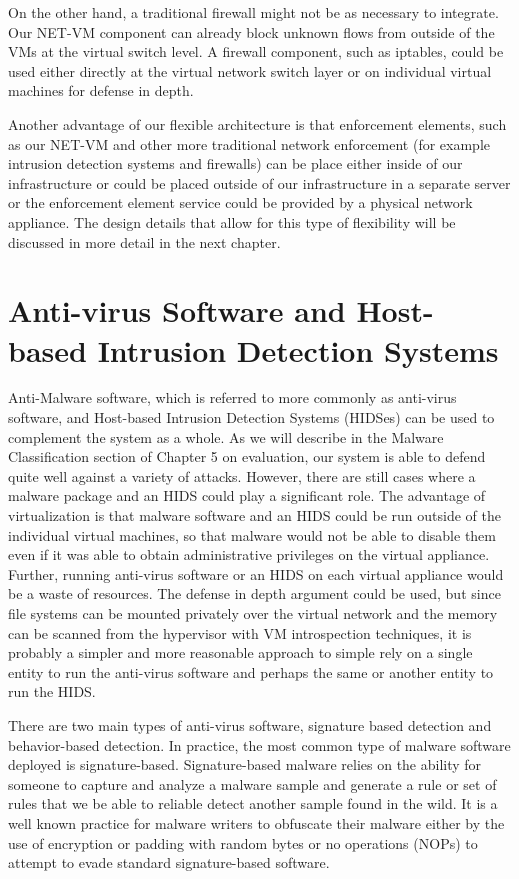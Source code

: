 On the other hand, a traditional firewall might not be as necessary to integrate. Our NET-VM component can already block unknown flows from outside of the VMs at the virtual switch level. A firewall component, such as iptables\cite{iptables_website}, could be used either directly at the virtual network switch layer or on individual virtual machines for defense in depth. 

Another advantage of our flexible architecture is that enforcement elements, such as our NET-VM and other more traditional network enforcement (for example intrusion detection systems and firewalls) can be place either inside of our infrastructure or could be placed outside of our infrastructure in a separate server or the enforcement element service could be provided by a physical network appliance. The design details that allow for this type of flexibility will be discussed in more detail in the next chapter.

\section{Anti-virus Software and Host-based Intrusion Detection Systems}

Anti-Malware software, which is referred to more commonly as anti-virus software, and Host-based Intrusion Detection Systems (HIDSes) can be used to complement the system as a whole. As we will describe in the Malware Classification section of Chapter 5 on evaluation, our system is able to defend quite well against a variety of attacks. However, there are still cases where a malware package and an HIDS could play a significant role. The advantage of virtualization is that malware software and an HIDS could be run outside of the individual virtual machines, so that malware would not be able to disable them even if it was able to obtain administrative privileges on the virtual appliance. Further, running anti-virus software or an HIDS on each virtual appliance would be a waste of resources. The defense in depth argument could be used, but since file systems can be mounted privately over the virtual network and the memory can be scanned from the hypervisor with VM introspection techniques, it is probably a simpler and more reasonable approach to simple rely on a single entity to run the anti-virus software and perhaps the same or another entity to run the HIDS.

There are two main types of anti-virus software, signature based detection and behavior-based detection. In practice, the most common type of malware software deployed is signature-based. Signature-based malware relies on the ability for someone to capture and analyze a malware sample and generate a rule or set of rules that we be able to reliable detect another sample found in the wild. It is a well known practice for malware writers to obfuscate their malware either by the use of encryption or padding with random bytes or no operations (NOPs) to attempt to evade standard signature-based software.

